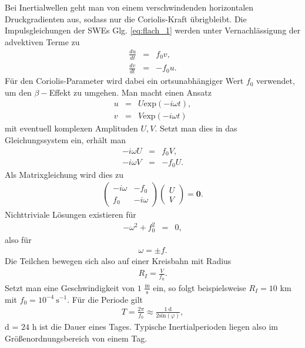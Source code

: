 \documentclass{book}
\renewcommand{\exp}{\text{exp}}
\renewcommand{\sin}{\text{sin}}
\begin{document}
Bei Inertialwellen geht man von einem verschwindenden horizontalen Druckgradienten aus, sodass nur die Coriolis-Kraft übrigbleibt. Die Impulsgleichungen der SWEs Glg. \eqref{eq:flach_1} werden unter Vernachlässigung der advektiven Terme zu
%
\begin{eqnarray}
\frac{d u}{d t} & = & f_0v,\\
\frac{d v}{d t} & = &  - f_0u.
\end{eqnarray}
%
Für den Coriolis-Parameter wird dabei ein ortsunabhängiger Wert $f_0$ verwendet, um den $\beta-$Effekt zu umgehen. Man macht einen Ansatz
%
\begin{eqnarray}
u & = & U\exp\left(-i\omega t\right),\\
v & = & V\exp\left(-i\omega t\right)
\end{eqnarray}
%
mit eventuell komplexen Amplituden $U, V$. Setzt man dies in das Gleichungssystem ein, erhält man
%
\begin{eqnarray}
- i\omega U & = & f_0V,\\
- i\omega V & = & -f_0 U.
\end{eqnarray}
%
Als Matrixgleichung wird dies zu
%
\begin{eqnarray}
\left(\begin{array}{cc}
- i\omega& -f_0\\
f_0& -i\omega
\end{array}\right)\left(\begin{array}{c}
U\\
V
\end{array}\right) = \mathbf{0}.
\end{eqnarray}
%
Nichttriviale Lösungen existieren für
%
\begin{eqnarray}
- \omega^2 + f_0^2 & = & 0, 
\end{eqnarray}
%
also für
%
\begin{eqnarray}
\omega = \pm f.
\end{eqnarray}
%
Die Teilchen bewegen sich also auf einer Kreisbahn mit Radius
%
\begin{eqnarray}
R_I = \frac{V}{f_0}.
\end{eqnarray}
%
Setzt man eine Geschwindigkeit von $1$ $\frac{\text{m}}{\text{s}}$ ein, so folgt beispielsweise $R_I = 10$ km mit $f_0 = 10^{-4}\:\text{s}^{-1}$. Für die Periode gilt
%
\begin{eqnarray}
T = \frac{2\pi}{f_0} \approx \frac{1\:\text{d}}{2\sin\left(\varphi\right)}, 
\end{eqnarray}
%
d = $24$ h ist die Dauer eines Tages. Typische Inertialperioden liegen also im Größenordnungsbereich von einem Tag.
\end{document}
